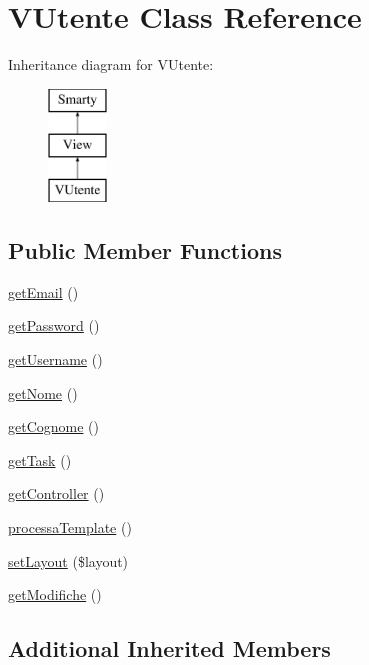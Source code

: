 \hypertarget{class_v_utente}{}\section{V\+Utente Class Reference}
\label{class_v_utente}
Inheritance diagram for V\+Utente\+:\begin{figure}[H]
\begin{center}
\leavevmode
\includegraphics[height=3.000000cm]{class_v_utente}
\end{center}
\end{figure}
\subsection*{Public Member Functions}
\begin{DoxyCompactItemize}
\item 
\mbox{\hyperlink{class_v_utente_a8e8e53d000b24756a28571714930f40b}{get\+Email}} ()
\item 
\mbox{\hyperlink{class_v_utente_a34488b491367055c085d4f0fd5098c46}{get\+Password}} ()
\item 
\mbox{\hyperlink{class_v_utente_a115864c6bb5d14f4a2d217393e181cd9}{get\+Username}} ()
\item 
\mbox{\hyperlink{class_v_utente_aee96c810144e5af6ce3679f7968dba7f}{get\+Nome}} ()
\item 
\mbox{\hyperlink{class_v_utente_a761813210ec7a6d4fc8255f47dc2c6fd}{get\+Cognome}} ()
\item 
\mbox{\hyperlink{class_v_utente_a14be18c29e1d3bed4ac995207515fb8f}{get\+Task}} ()
\item 
\mbox{\hyperlink{class_v_utente_a7c31b84c15e80c9150c15d60c1807a20}{get\+Controller}} ()
\item 
\mbox{\hyperlink{class_v_utente_a76ea328ab7d219856682ff832b9419e0}{processa\+Template}} ()
\item 
\mbox{\hyperlink{class_v_utente_ae30bdda632dfa1f36c4da8bc801bdba1}{set\+Layout}} (\$layout)
\item 
\mbox{\hyperlink{class_v_utente_acff12f16c55ce487294d48e63616ca58}{get\+Modifiche}} ()
\end{DoxyCompactItemize}
\subsection*{Additional Inherited Members}


